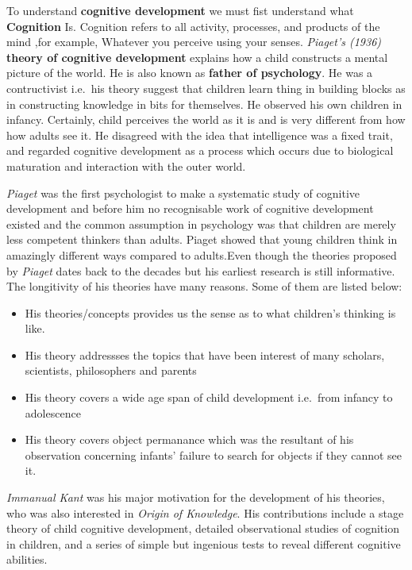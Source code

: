 \documentclass[11pt]{article}
\providecommand{\tightlist}{%
      \setlength{\itemsep}{0pt}\setlength{\parskip}{0pt}}
\begin{document}
To understand \textbf{cognitive development} we must fist understand
what \textbf{Cognition} Is. Cognition refers to all activity, processes,
and products of the mind ,for example, Whatever you perceive using your
senses. \emph{Piaget's (1936)} \textbf{theory of cognitive development}
explains how a child constructs a mental picture of the world. He is
also known as \textbf{father of psychology}. He was a contructivist
i.e.~his theory suggest that children learn thing in building blocks as
in constructing knowledge in bits for themselves. He observed his own
children in infancy. Certainly, child perceives the world as it is and
is very different from how how adults see it. He disagreed with the idea
that intelligence was a fixed trait, and regarded cognitive development
as a process which occurs due to biological maturation and interaction
with the outer world.

\emph{Piaget }was the first psychologist to make a systematic study of
cognitive development and before him no recognisable work of cognitive
development existed and the common assumption in psychology was that
children are merely less competent thinkers than adults. Piaget showed
that young children think in amazingly different ways compared to
adults.Even though the theories proposed by \emph{Piaget} dates back to
the decades but his earliest research is still informative. The
longitivity of his theories have many reasons. Some of them are listed
below:

\begin{itemize}
\tightlist
\item
  His theories/concepts provides us the sense as to what children's
  thinking is like.
\item
  His theory addressses the topics that have been interest of many
  scholars, scientists, philosophers and parents
\item
  His theory covers a wide age span of child development i.e.~from
  infancy to adolescence
\item
  His theory covers object permanance which was the resultant of his
  observation concerning infants' failure to search for objects if they
  cannot see it.
\end{itemize}

\emph{Immanual Kant} was his major motivation for the development of his
theories, who was also interested in \emph{Origin of Knowledge}. His
contributions include a stage theory of child cognitive development,
detailed observational studies of cognition in children, and a series of
simple but ingenious tests to reveal different cognitive abilities.
\end{document}
